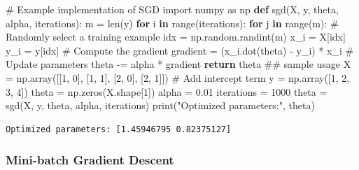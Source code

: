 \documentclass[
  letterpaper,
  DIV=11,
  numbers=noendperiod]{scrreprt}
\newenvironment{Shaded}{\begin{snugshade}}{\end{snugshade}}
\newcommand{\BuiltInTok}[1]{\textcolor[rgb]{0.00,0.23,0.31}{#1}}
\newcommand{\CommentTok}[1]{\textcolor[rgb]{0.37,0.37,0.37}{#1}}
\newcommand{\ControlFlowTok}[1]{\textcolor[rgb]{0.00,0.23,0.31}{\textbf{#1}}}
\newcommand{\DecValTok}[1]{\textcolor[rgb]{0.68,0.00,0.00}{#1}}
\newcommand{\FloatTok}[1]{\textcolor[rgb]{0.68,0.00,0.00}{#1}}
\newcommand{\ImportTok}[1]{\textcolor[rgb]{0.00,0.46,0.62}{#1}}
\newcommand{\KeywordTok}[1]{\textcolor[rgb]{0.00,0.23,0.31}{\textbf{#1}}}
\newcommand{\NormalTok}[1]{\textcolor[rgb]{0.00,0.23,0.31}{#1}}
\newcommand{\OperatorTok}[1]{\textcolor[rgb]{0.37,0.37,0.37}{#1}}
\newcommand{\StringTok}[1]{\textcolor[rgb]{0.13,0.47,0.30}{#1}}
\begin{document}
\begin{Shaded}
\begin{Highlighting}[]
\CommentTok{\# Example implementation of SGD}
\ImportTok{import}\NormalTok{ numpy }\ImportTok{as}\NormalTok{ np}
\KeywordTok{def}\NormalTok{ sgd(X, y, theta, alpha, iterations):}
\NormalTok{    m }\OperatorTok{=} \BuiltInTok{len}\NormalTok{(y)}
    \ControlFlowTok{for}\NormalTok{ i }\KeywordTok{in} \BuiltInTok{range}\NormalTok{(iterations):}
        \ControlFlowTok{for}\NormalTok{ j }\KeywordTok{in} \BuiltInTok{range}\NormalTok{(m):}
            \CommentTok{\# Randomly select a training example}
\NormalTok{            idx }\OperatorTok{=}\NormalTok{ np.random.randint(m)}
\NormalTok{            x\_i }\OperatorTok{=}\NormalTok{ X[idx]}
\NormalTok{            y\_i }\OperatorTok{=}\NormalTok{ y[idx]}
            \CommentTok{\# Compute the gradient}
\NormalTok{            gradient }\OperatorTok{=}\NormalTok{ (x\_i.dot(theta) }\OperatorTok{{-}}\NormalTok{ y\_i) }\OperatorTok{*}\NormalTok{ x\_i}
            \CommentTok{\# Update parameters}
\NormalTok{            theta }\OperatorTok{{-}=}\NormalTok{ alpha }\OperatorTok{*}\NormalTok{ gradient}
    \ControlFlowTok{return}\NormalTok{ theta}
\CommentTok{\#\# sample usage}
\NormalTok{X }\OperatorTok{=}\NormalTok{ np.array([[}\DecValTok{1}\NormalTok{, }\DecValTok{0}\NormalTok{], [}\DecValTok{1}\NormalTok{, }\DecValTok{1}\NormalTok{], [}\DecValTok{2}\NormalTok{, }\DecValTok{0}\NormalTok{], [}\DecValTok{2}\NormalTok{, }\DecValTok{1}\NormalTok{]])  }\CommentTok{\# Add intercept term}
\NormalTok{y }\OperatorTok{=}\NormalTok{ np.array([}\DecValTok{1}\NormalTok{, }\DecValTok{2}\NormalTok{, }\DecValTok{3}\NormalTok{, }\DecValTok{4}\NormalTok{])}
\NormalTok{theta }\OperatorTok{=}\NormalTok{ np.zeros(X.shape[}\DecValTok{1}\NormalTok{])}
\NormalTok{alpha }\OperatorTok{=} \FloatTok{0.01}
\NormalTok{iterations }\OperatorTok{=} \DecValTok{1000}
\NormalTok{theta }\OperatorTok{=}\NormalTok{ sgd(X, y, theta, alpha, iterations)}
\BuiltInTok{print}\NormalTok{(}\StringTok{"Optimized parameters:"}\NormalTok{, theta)}
\end{Highlighting}
\end{Shaded}

\begin{verbatim}
Optimized parameters: [1.45946795 0.82375127]
\end{verbatim}

\subsubsection{Mini-batch Gradient
Descent}\label{mini-batch-gradient-descent}
\end{document}
